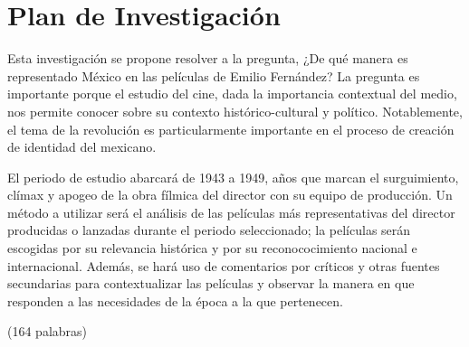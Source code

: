\section{Plan de Investigación}
Esta investigación se propone resolver a la pregunta,
¿De qué manera es representado México en las películas de Emilio Fernández? 
La pregunta es importante porque el estudio del cine, dada la importancia
contextual del medio, nos permite conocer sobre su contexto histórico-cultural y
político.  %
Notablemente, el tema de la revolución es particularmente importante en el proceso de creación de identidad del mexicano. %

El periodo de estudio abarcará de 1943 a 1949, años que marcan el surguimiento, clímax y apogeo de la obra fílmica del director con su equipo de producción. %
Un método a utilizar será el análisis de las películas más representativas del director producidas o lanzadas durante el periodo seleccionado; la películas serán escogidas por su relevancia histórica y por su reconococimiento nacional e internacional. Además, se hará uso de comentarios por críticos y otras fuentes secundarias para contextualizar las películas y observar la manera en que responden a las necesidades de la época a la que pertenecen.

(164 palabras)
\pagebreak
